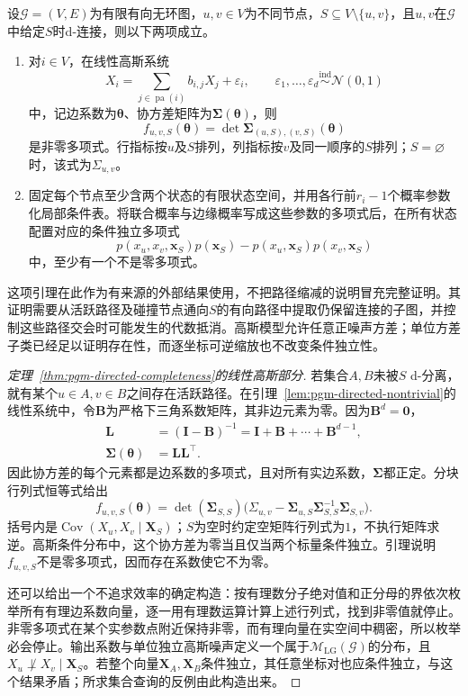 \begin{lemma}[条件独立约束的非平凡性]
  \label{lem:pgm-directed-nontrivial}
  设$\mathcal{G}=(V,E)$为有限有向无环图，$u,v\in V$为不同节点，$S\subseteq V\setminus\{u,v\}$，且$u,v$在$\mathcal{G}$中给定$S$时d-连接，则以下两项成立。
  \begin{enumerate}
    \item 对$i\in V$，在线性高斯系统
    \[
      X_i=\sum_{j\in\operatorname{pa}(i)}b_{i,j}X_j+\varepsilon_i,
      \qquad
      \varepsilon_1,\ldots,\varepsilon_d
      \mathrel{\overset{\mathrm{ind}}{\sim}}\mathcal N(0,1)
    \]
    中，记边系数为$\bm{\theta}$、协方差矩阵为$\bm{\Sigma}(\bm{\theta})$，则
    \[
      f_{u,v,S}(\bm{\theta})
      =\det\bm{\Sigma}_{(u,S),(v,S)}(\bm{\theta})
    \]
    是非零多项式。行指标按$u$及$S$排列，列指标按$v$及同一顺序的$S$排列；$S=\varnothing$时，该式为$\Sigma_{u,v}$。
    \item 固定每个节点至少含两个状态的有限状态空间，并用各行前$r_i-1$个概率参数化局部条件表。将联合概率与边缘概率写成这些参数的多项式后，在所有状态配置对应的条件独立多项式
    \[
      p(x_u,x_v,\bm{x}_S)p(\bm{x}_S)
      -p(x_u,\bm{x}_S)p(x_v,\bm{x}_S)
    \]
    中，至少有一个不是零多项式。
  \end{enumerate}
\end{lemma}

这项引理在此作为有来源的外部结果使用，不把路径缩减的说明冒充完整证明。其证明需要从活跃路径及碰撞节点通向$S$的有向路径中提取仍保留连接的子图，并控制这些路径交会时可能发生的代数抵消。高斯模型允许任意正噪声方差；单位方差子类已经足以证明存在性，而逐坐标可逆缩放也不改变条件独立性。

\begin{proof}[定理~\ref{thm:pgm-directed-completeness}的线性高斯部分]
若集合$A,B$未被$S$ d-分离，就有某个$u\in A,v\in B$之间存在活跃路径。在引理~\ref{lem:pgm-directed-nontrivial}的线性系统中，令$\bm{B}$为严格下三角系数矩阵，其非边元素为零。因为$\bm{B}^d=\bm 0$，
\[
  \begin{aligned}
    \bm{L}&=(\bm{I}-\bm{B})^{-1}
       =\bm{I}+\bm{B}+\cdots+\bm{B}^{d-1},\\
    \bm{\Sigma}(\bm{\theta})&=\bm{L}\bm{L}^{\top}.
  \end{aligned}
\]
因此协方差的每个元素都是边系数的多项式，且对所有实边系数，$\bm{\Sigma}$都正定。分块行列式恒等式给出
\[
  f_{u,v,S}(\bm{\theta})
    =\det(\bm{\Sigma}_{S,S})
      \bigl(\Sigma_{u,v}
        -\bm{\Sigma}_{u,S}\bm{\Sigma}_{S,S}^{-1}
         \bm{\Sigma}_{S,v}\bigr).
\]
括号内是$\operatorname{Cov}(X_u,X_v\mid\bm X_S)$；$S$为空时约定空矩阵行列式为$1$，不执行矩阵求逆。高斯条件分布中，这个协方差为零当且仅当两个标量条件独立。引理说明$f_{u,v,S}$不是零多项式，因而存在系数使它不为零。

还可以给出一个不追求效率的确定构造：按有理数分子绝对值和正分母的界依次枚举所有有理边系数向量，逐一用有理数运算计算上述行列式，找到非零值就停止。非零多项式在某个实参数点附近保持非零，而有理向量在实空间中稠密，所以枚举必会停止。输出系数与单位独立高斯噪声定义一个属于$\mathcal{M}_{\mathrm{LG}}(\mathcal{G})$的分布，且$X_u\not\perp X_v\mid\bm X_S$。若整个向量$\bm X_A,\bm X_B$条件独立，其任意坐标对也应条件独立，与这个结果矛盾；所求集合查询的反例由此构造出来。
\end{proof}

